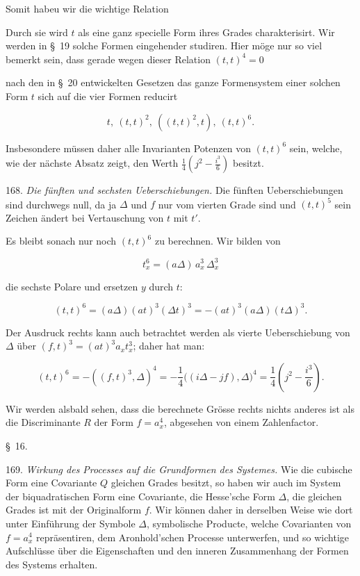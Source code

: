 Somit habeu wir die wichtige Relation %


Durch sie wird $t$ als eine ganz specielle Form ihres Grades charakterisirt. Wir werden in \S~19 solche Formen eingehender studiren. Hier möge nur so viel bemerkt sein, dass gerade wegen dieser Relation $(t,t)^4=0$



nach den in \S~20 entwickelten Gesetzen das ganze Formensystem einer solchen Form $t$ sich auf die vier Formen reducirt

\[
t,\ (t,t)^2,\ ((t,t)^2,t),\ (t,t)^6.
\]

Insbesondere müssen daher alle Invarianten Potenzen von $(t,t)^6$ sein, welche, wie der nächste Absatz zeigt, den Werth $\frac{1}{4}\left(j^2-\frac{i^3}{6}\right)$ besitzt.

168. \textit{Die fünften und sechsten Ueberschiebungen.} Die fünften Ueberschiebungen sind durchwegs null, da ja $\Delta$ und $f$ nur vom vierten Grade sind und $(t,t)^5$ sein Zeichen ändert bei Vertauschung von $t$ mit $t'$.

Es bleibt sonach nur noch $(t,t)^6$ zu berechnen. Wir bilden von

\[
t_x^6 = (a\Delta)\,a_x^3\,\Delta_x^3
\]

die sechste Polare und ersetzen $y$ durch $t$:

\[
(t,t)^6 = (a\Delta)(at)^3(\Delta t)^3 = -(at)^3(a\Delta)(t\Delta)^3.
\]

Der Ausdruck rechts kann auch betrachtet werden als vierte Ueberschiebung von $\Delta$ über $(f,t)^3=(at)^3a_x t_x^3$; daher hat man:

\[
(t,t)^6 = -((f,t)^3,\Delta)^4 = -\frac{1}{4}\big((i\Delta-jf),\Delta\big)^4 = \frac{1}{4}\left(j^2-\frac{i^3}{6}\right).
\]

Wir werden alsbald sehen, dass die berechnete Grösse rechts nichts anderes ist als die Discriminante $R$ der Form $f=a_x^4$, abgesehen von einem Zahlenfactor.

\begin{center}
\S~16.

\end{center}

169. \textit{Wirkung des Processes auf die Grundformen des Systemes.} Wie die cubische Form eine Covariante $Q$ gleichen Grades besitzt, so haben wir auch im System der biquadratischen Form eine Covariante, die Hesse'sche Form $\Delta$, die gleichen Grades ist mit der Originalform $f$. Wir können daher in derselben Weise wie dort unter Einführung der Symbole $\Delta$, symbolische Producte, welche Covarianten von $f=a_x^4$ repräsentiren, dem Aronhold'schen Processe unterwerfen, und so wichtige Aufschlüsse über die Eigenschaften und den inneren Zusammenhang der Formen des Systems erhalten.

